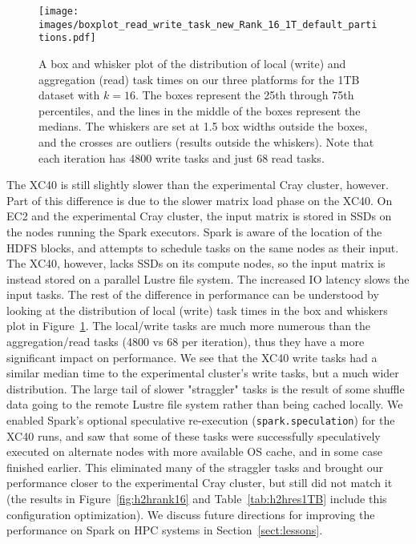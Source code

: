    \begin{figure}
    \begin{centering}
    \texttt{[image: images/boxplot\_read\_write\_task\_new\_Rank\_16\_1T\_default\_partitions.pdf]}
    \end{centering}
    \caption{A box and whisker plot of the distribution of local (write) and aggregation (read) task times on our three platforms for the 1TB dataset with $k=16$.  The boxes represent the 25th through 75th percentiles, and the lines in the middle of the boxes represent the medians.  The whiskers are set at 1.5 box widths outside the boxes, and the crosses are outliers (results outside the whiskers).  Note that each iteration has 4800 write tasks and just 68 read tasks.}
    \label{fig:rwtaskdist} 
    \end{figure}

The XC40 is still slightly slower than the experimental Cray cluster, however.
Part of this difference is due to the slower matrix load phase on the XC40.  On
EC2 and the experimental Cray cluster, the input matrix is stored in SSDs on
the nodes running the Spark executors.  Spark is aware of the location of the
HDFS blocks, and attempts to schedule tasks on the same nodes as their input.
The XC40, however, lacks SSDs on its compute nodes, so the input matrix is
instead stored on a parallel Lustre file system.  The increased IO latency
slows the input tasks. The rest of the difference in performance can be
understood by looking at the distribution of local (write) task times in the
box and whiskers plot in Figure~\ref{fig:rwtaskdist}.  The local/write tasks
are much more numerous than the aggregation/read tasks (4800 vs 68 per
iteration), thus they have a more significant impact on performance.  We see
that the XC40 write tasks had a similar median time to the experimental
cluster's write tasks, but a much wider distribution.  The large tail of slower
"straggler" tasks is the result of some shuffle data going to the remote Lustre
file system rather than being cached locally. We enabled Spark's optional
speculative re-execution (\texttt{spark.speculation}) for the XC40 runs, and
saw that some of these tasks were successfully speculatively executed on
alternate nodes with more available OS cache, and in some case finished
earlier.  This eliminated many of the straggler tasks and brought our
performance closer to the experimental Cray cluster, but still did not match it
(the results in Figure~\ref{fig:h2hrank16} and Table~\ref{tab:h2hres1TB}
include this configuration optimization).  We discuss future directions for
improving the performance on Spark on HPC systems in
Section~\ref{sect:lessons}.
